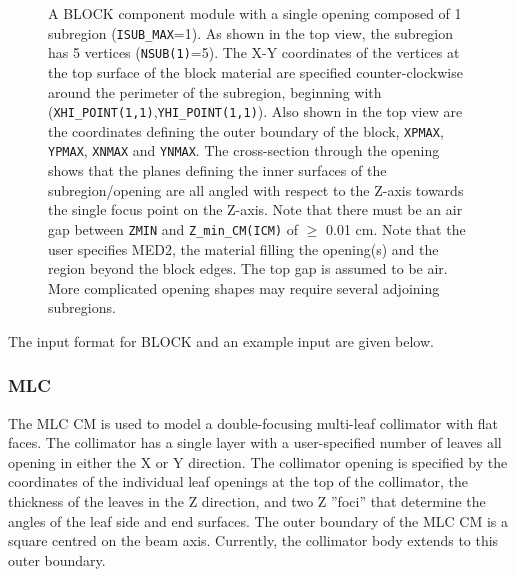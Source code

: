 \documentclass[12pt,twoside]{article}
\begin{document}
\begin{figure}[htp]
\begin{center}
\begin{htmlonly}
\end{htmlonly}
\end{center}
\vspace{1cm}
\caption[BLOCK CM geometry]
{A BLOCK component module with a single opening composed of 1
subregion ({\tt ISUB\_MAX}=1).  As shown in the top view, the subregion
has 5 vertices ({\tt NSUB(1)}=5).  The X-Y coordinates of the vertices
at the top surface of the block material are specified counter-clockwise
around the perimeter of the subregion, beginning with
({\tt XHI\_POINT(1,1)},{\tt YHI\_POINT(1,1)}).  Also shown in the top
view are the coordinates defining the outer boundary of the block,
{\tt XPMAX}, {\tt YPMAX}, {\tt XNMAX} and {\tt YNMAX}.
The cross-section through
the opening shows that the planes defining the inner surfaces of the
subregion/opening are all angled with respect to the Z-axis towards the
single focus point on the Z-axis.  Note that there must be an air gap
between {\tt ZMIN} and {\tt Z\_min\_CM(ICM)} of $\geq$ 0.01 cm.  Note that
the user specifies MED2, the material filling the opening(s) and the region
beyond the block edges.
The top gap is assumed to be air.  More complicated
opening shapes may require several adjoining subregions.}
\label{fig_BLOCKD}
\end{figure}


\clearpage
The input format for BLOCK and an example input are given below.
\begin{small}

\end{small}




\clearpage


\subsubsection{MLC}
\renewcommand{\rightmark}{MLC CM}
The MLC CM is used to model a double-focusing multi-leaf collimator with
flat faces.
The collimator has a single layer with a user-specified number of leaves
all opening in either the X or Y direction.  The collimator opening is
specified by the coordinates of the individual leaf openings at the top of the
collimator, the thickness of the leaves in the Z direction, and two
Z ''foci'' that determine the angles of the leaf side and end
surfaces.
The outer boundary of the MLC CM is a square centred on
the beam axis.  Currently, the collimator body extends to this outer boundary.
\end{document}
